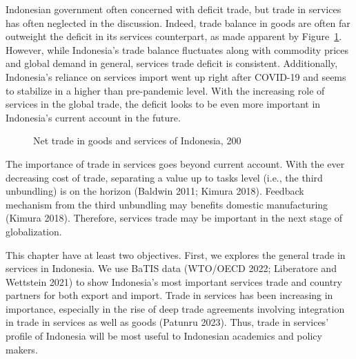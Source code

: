 \documentclass[
  a4paper,
  DIV=11,
  numbers=noendperiod]{scrreprt}
\begin{document}
Indonesian government often concerned with deficit trade, but trade in
services has often neglected in the discussion. Indeed, trade balance in
goods are often far outweight the deficit in its services counterpart,
as made apparent by Figure~\ref{fig-2}. However, while Indonesia's trade
balance fluctuates along with commodity prices and global demand in
general, services trade deficit is consistent. Additionally, Indonesia's
reliance on services import went up right after COVID-19 and seems to
stabilize in a higher than pre-pandemic level. With the increasing role
of services in the global trade, the deficit looks to be even more
important in Indonesia's current account in the future.

\begin{figure}


\caption{\label{fig-2}Net trade in goods and services of Indonesia, 200}

\end{figure}%

The importance of trade in services goes beyond current account. With
the ever decreasing cost of trade, separating a value up to tasks level
(i.e., the third unbundling) is on the horizon (Baldwin 2011; Kimura
2018). Feedback mechanism from the third unbundling may benefits
domestic manufacturing (Kimura 2018). Therefore, services trade may be
important in the next stage of globalization.

This chapter have at least two objectives. First, we explores the
general trade in services in Indonesia. We use BaTIS data (WTO/OECD
2022; Liberatore and Wettstein 2021) to show Indonesia's most important
services trade and country partners for both export and import. Trade in
services has been increasing in importance, especially in the rise of
deep trade agreements involving integration in trade in services as well
as goods (Patunru 2023). Thus, trade in services' profile of Indonesia
will be most useful to Indonesian academics and policy makers.
\end{document}
